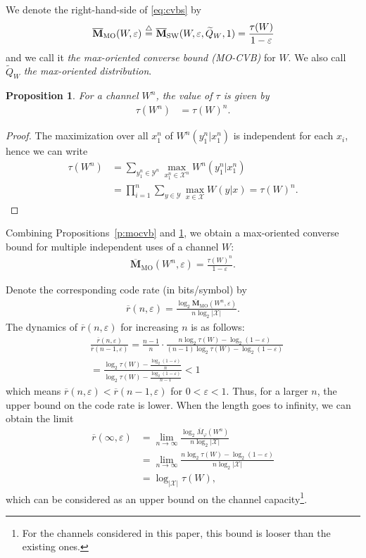 \documentclass[journal, twocol]{IEEEtran}
\newcommand{\oM}{{\overline{M}}}
\newcommand{\obfM}{{\overline{\mathbf{M}}}}
\newcommand{\tQ}{{\widetilde{Q}}}
\newcommand{\mX}{{\mathcal{X}}}
\newcommand{\mY}{{\mathcal{Y}}}
\newcommand{\defeq}{{\overset{\triangle}{=}}}
\newcommand{\ve}{\varepsilon}
\newcommand{\vp}{\varphi}
\newtheorem{proposition}{Proposition}
\begin{document}
We denote the right-hand-side of \eqref{eq:cvbs} by 
\begin{align}
\obfM_\textsc{MO}(W,\ve)\ \defeq\ \obfM_\text{SW}(W,\ve,\tQ_W,1) = \frac{\tau(W)}{1-\ve}
\end{align}
and we call it \emph{the max-oriented converse bound (MO-CVB)} for $W$.
We also call $\tQ_W$ \emph{the max-oriented distribution}. 

\begin{proposition}
\label{p:taun}    
For a channel $W^n$, the value of $\tau$ is given by
\begin{align}
\tau(W^n)&=\tau(W)^n.
\label{eq:tauwn}
\end{align}
\end{proposition}
\begin{proof}
The maximization over all $x_1^{n}$ of $W^n(y_1^n|x_1^n)$ is independent for each $x_i$, hence we can write
\begin{align}
\tau(W^n)&=\sum_{y_1^{n}\in\mY^n}\max_{x_1^n \in \mX^n} W^n(y_1^n|x_1^n)
\nonumber\\&
=\prod_{i=1}^n \sum_{y\in	\mY} \max_{x \in \mX} W(y|x)=\tau(W)^n.
\label{eq:tauwnp}
\end{align}
\end{proof}

Combining Propositions~\ref{p:mocvb} and \ref{p:taun}, we obtain a max-oriented converse bound for multiple independent uses of a channel $W$:
\begin{align}
\obfM_\text{MO}(W^n,\ve) = \frac{\tau(W)^n}{1-\ve}.
\label{eq:Mn}
\end{align}

Denote the corresponding code rate (in bits/symbol) by 
\begin{align}
\overline{r}(n,\ve)=\frac{\log_2 \obfM_\text{MO}(W^n,\ve)}{n\log_2 |\mX|}.
\label{eq:rWn}
\end{align}
The dynamics of $\overline{r}(n,\ve)$ for increasing $n$ is as follows:
{\allowdisplaybreaks
\begin{align}
&\frac{\overline{r}(n,\ve)}{\overline{r}(n-1,\ve)}
=\frac{n-1}{n}\cdot \frac{n\log_2\tau(W)-\log_2(1-\ve)}{(n-1)\log_2\tau(W)-\log_2(1-\ve)}
\nonumber \\&
= \frac{\log_2\tau(W)-\frac{\log_2(1-\ve)}{n}}{\log_2\tau(W)-\frac{\log_2(1-\ve)}{n-1}}<1
\end{align}
}%
which means $\overline{r}(n,\ve) < \overline{r}(n-1,\ve)$ for $0<\ve<1$.
Thus, for a larger $n$, the upper bound on the code rate is lower.
When the length goes to infinity, we can obtain the limit
\begin{align}
\overline{r}(\infty,\ve) & =\lim_{n\to\infty} \frac{\log_2\oM_\vp(W^n)}{n\log_2 |\mX| }
\nonumber \\ & =
\lim_{n\to\infty} \frac{n\log_2\tau(W)-\log_2(1-\ve)}{n\log_2|\mX|} 
\nonumber \\ & =\log_{|\mX|}\tau(W),
\label{eq:rhoinf}
\end{align}
which can be considered as an upper bound on the channel capacity\footnote{For the channels considered in this paper, this bound is looser than the existing ones.}.
\end{document}
